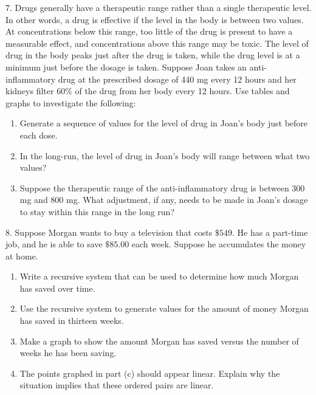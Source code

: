 \documentclass[10pt,]{book}
\theoremstyle{plain}
\theoremstyle{definition}
\theoremstyle{definition}
\theoremstyle{definition}
\numberwithin{equation}{section}
\begin{document}
\begin{exerciselist}
\begin{enumerate}[label=(\alph*)]
\end{enumerate}
%
\par\smallskip
\item[7.]\hypertarget{exercise-9}{}Drugs generally have a therapeutic range rather than a single therapeutic level.  In other words, a drug is effective if the level in the body is between two values.  At concentrations below this range, too little of the drug is present to have a measurable effect, and concentrations above this range may be toxic.  The level of drug in the body peaks just after the drug is taken, while the drug level is at a minimum just before the dosage is taken.  Suppose Joan takes an anti-inflammatory drug at the prescribed dosage of 440 mg every 12 hours and her kidneys filter \(60\%\) of the drug from her body every 12 hours.  Use tables and graphs to investigate the following: \leavevmode%
\begin{enumerate}[label=(\alph*)]
\item\hypertarget{li-31}{}Generate a sequence of values for the level of drug in Joan’s body just before each dose.%
\item\hypertarget{li-32}{}In the long-run, the level of drug in Joan’s body will range  between what two values?%
\item\hypertarget{li-33}{}Suppose the therapeutic range of the anti-inflammatory drug is between 300 mg and 800 mg.  What adjustment, if any, needs to be made in Joan’s dosage to stay within this range in the long run?%
\end{enumerate}
%
\par\smallskip
\item[8.]\hypertarget{exercise-10}{}Suppose Morgan  wants to buy a television that costs \(\$549\).  He has a part-time job, and he is able to save \(\$85.00\) each week.  Suppose he accumulates the money at home. \leavevmode%
\begin{enumerate}[label=(\alph*)]
\item\hypertarget{li-34}{}Write a recursive system that can be used to determine how much Morgan has saved over time.%
\item\hypertarget{li-35}{}Use the recursive system to generate values for the amount of money Morgan has saved in thirteen weeks.%
\item\hypertarget{li-36}{}Make a graph to show the amount Morgan has saved versus the number of weeks he has been saving.%
\item\hypertarget{li-37}{}The points graphed in part (c) should appear linear.  Explain why the situation implies that these ordered pairs are linear.%

\end{enumerate}
\end{exerciselist}
\end{document}
